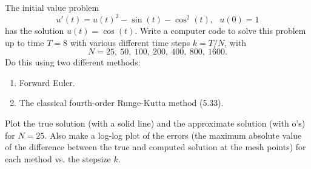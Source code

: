 \documentclass[10pt]{article}
\begin{document}
\begin{problem}[Problem 5]
The initial value problem
\[
u'(t) = u(t )^2 - \sin (t) - \cos^2 (t) ,~~~u(0) = 1
\]
has the solution \( u(t) = \cos (t) \).  Write a computer code to solve this problem up to time \( T=8 \)
with various different time steps \( k = T/N \), with
\[
N = 25,~50,~100,~200,~400,~800,~1600.
\]
Do this using two different methods:
\begin{enumerate}[label=(\alph*)]
\item Forward Euler.
\item The classical fourth-order Runge-Kutta method (5.33).
\end{enumerate}

Plot the true solution (with a solid line) and the approximate solution (with o's) for \( N=25 \).
Also make a log-log plot of the errors (the maximum absolute value of the difference between the true and
computed solution at the mesh points) for each method vs. the stepsize \( k \).
\end{problem}
\end{document}
